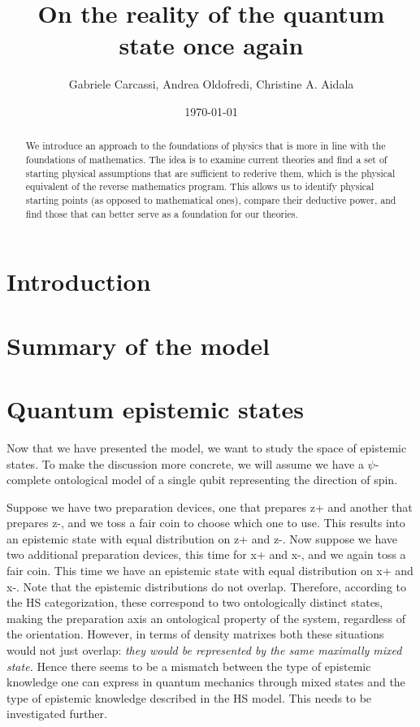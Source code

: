 \documentclass[10pt,twocolumn, nofootinbib]{revtex4-2}
\begin{document}
\title{On the reality of the quantum state once again}
\author{Gabriele Carcassi, Andrea Oldofredi, Christine A. Aidala}

\date{\today}


\begin{abstract}
We introduce an approach to the foundations of physics that is more in line with the foundations of mathematics. The idea is to examine current theories and find a set of starting physical assumptions that are sufficient to rederive them, which is the physical equivalent of the reverse mathematics program. This allows us to identify physical starting points (as opposed to mathematical ones), compare their deductive power, and find those that can better serve as a foundation for our theories.
\end{abstract}

\maketitle

\section{Introduction}

\section{Summary of the model}

\section{Quantum epistemic states}
Now that we have presented the model, we want to study the space of epistemic states. To make the discussion more concrete, we will assume we have a $\psi$-complete ontological model of a single qubit representing the direction of spin.

Suppose we have two preparation devices, one that prepares z+ and another that prepares z-, and we toss a fair coin to choose which one to use. This results into an epistemic state with equal distribution on z+ and z-. Now suppose we have two additional preparation devices, this time for x+ and x-, and we again toss a fair coin. This time we have an epistemic state with equal distribution on x+ and x-. Note that the epistemic distributions do not overlap. Therefore, according to the HS categorization, these correspond to two ontologically distinct states, making the preparation axis an ontological property of the system, regardless of the orientation. However, in terms of density matrixes both these situations would not just overlap: \emph{they would be represented by the same maximally mixed state.} Hence there seems to be a mismatch between the type of epistemic knowledge one can express in quantum mechanics through mixed states and the type of epistemic knowledge described in the HS model. This needs to be investigated further.
\end{document}
